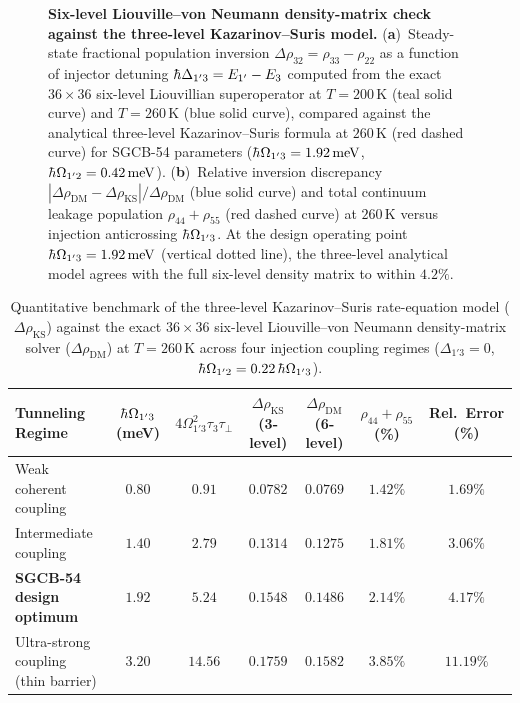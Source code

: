 \documentclass[11pt,letterpaper]{article}
\renewcommand{\hbar}{\mathchar'26\mkern-9mu h}
\begin{document}
\begin{figure}[t!]
\centering
\resizebox{0.97\textwidth}{!}{}
\caption{\textbf{Six-level Liouville--von Neumann density-matrix check against the three-level Kazarinov--Suris model.} (\textbf{a})~Steady-state fractional population inversion $\Delta\rho_{32} = \rho_{33} - \rho_{22}$ as a function of injector detuning $\hbar\Delta_{1'3} = E_{1'} - E_3$ computed from the exact $36\times 36$ six-level Liouvillian superoperator at $T = 200\,\mathrm{K}$ (teal solid curve) and $T = 260\,\mathrm{K}$ (blue solid curve), compared against the analytical three-level Kazarinov--Suris formula at $260\,\mathrm{K}$ (red dashed curve) for SGCB-54 parameters ($\hbar\Omega_{1'3} = 1.92\,\mathrm{meV}$, $\hbar\Omega_{1'2} = 0.42\,\mathrm{meV}$). (\textbf{b})~Relative inversion discrepancy $|\Delta\rho_{\mathrm{DM}} - \Delta\rho_{\mathrm{KS}}|/\Delta\rho_{\mathrm{DM}}$ (blue solid curve) and total continuum leakage population $\rho_{44} + \rho_{55}$ (red dashed curve) at $260\,\mathrm{K}$ versus injection anticrossing $\hbar\Omega_{1'3}$. At the design operating point $\hbar\Omega_{1'3} = 1.92\,\mathrm{meV}$ (vertical dotted line), the three-level analytical model agrees with the full six-level density matrix to within $4.2\%$.}
\label{fig:dm_check}
\end{figure}

\begin{table}[t!]
\centering
\caption{Quantitative benchmark of the three-level Kazarinov--Suris rate-equation model ($\Delta\rho_{\mathrm{KS}}$) against the exact $36\times 36$ six-level Liouville--von Neumann density-matrix solver ($\Delta\rho_{\mathrm{DM}}$) at $T = 260\,\mathrm{K}$ across four injection coupling regimes ($\Delta_{1'3} = 0$, $\hbar\Omega_{1'2} = 0.22\,\hbar\Omega_{1'3}$).}
\vspace{6pt}
\footnotesize
\begin{tabular}{@{}lcccccc@{}}
\toprule
\textbf{Tunneling Regime} & $\hbar\Omega_{1'3}$ (meV) & $4\Omega_{1'3}^2\tau_3\tau_\perp$ & $\Delta\rho_{\mathrm{KS}}$ (3-level) & $\Delta\rho_{\mathrm{DM}}$ (6-level) & $\rho_{44} + \rho_{55}$ (\%) & Rel.\ Error (\%) \\
\midrule
Weak coherent coupling & $0.80$ & $0.91$ & $0.0782$ & $0.0769$ & $1.42\%$ & $1.69\%$ \\
Intermediate coupling & $1.40$ & $2.79$ & $0.1314$ & $0.1275$ & $1.81\%$ & $3.06\%$ \\
\textbf{SGCB-54 design optimum} & $\mathbf{1.92}$ & $\mathbf{5.24}$ & $\mathbf{0.1548}$ & $\mathbf{0.1486}$ & $\mathbf{2.14\%}$ & $\mathbf{4.17\%}$ \\
Ultra-strong coupling (thin barrier) & $3.20$ & $14.56$ & $0.1759$ & $0.1582$ & $3.85\%$ & $11.19\%$ \\
\bottomrule
\end{tabular}
\label{tab:dm_benchmark}
\end{table}
\end{document}

